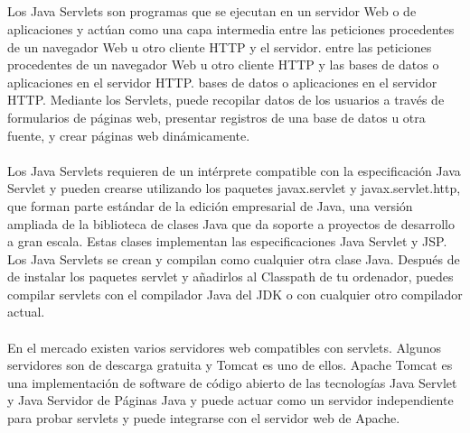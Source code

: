 \documentclass[10pt,a4paper]{article}
\begin{document}
\subsection{\color{colorESCOM}{Servlet}}
\normalsize{
Los Java Servlets son programas que se ejecutan en un servidor Web o de aplicaciones y actúan como una capa intermedia entre las peticiones procedentes de un navegador Web u otro cliente HTTP y el servidor.
entre las peticiones procedentes de un navegador Web u otro cliente HTTP y las bases de datos o aplicaciones en el servidor HTTP.
bases de datos o aplicaciones en el servidor HTTP.
Mediante los Servlets, puede recopilar datos de los usuarios a través de formularios de páginas web, presentar
registros de una base de datos u otra fuente, y crear páginas web dinámicamente.
\\
\\
Los Java Servlets requieren de un intérprete compatible con la especificación Java Servlet y pueden crearse utilizando los paquetes javax.servlet y javax.servlet.http,
que forman parte estándar de la edición empresarial de Java, una versión ampliada de la
biblioteca de clases Java que da soporte a proyectos de desarrollo a gran escala.
Estas clases implementan las especificaciones Java Servlet y JSP.
Los Java Servlets se crean y compilan como cualquier otra clase Java. Después de
de instalar los paquetes servlet y añadirlos al Classpath de tu ordenador, puedes compilar
servlets con el compilador Java del JDK o con cualquier otro compilador actual.
\\
\\
En el mercado existen varios servidores web compatibles con servlets. Algunos servidores
son de descarga gratuita y Tomcat es uno de ellos.
Apache Tomcat es una implementación de software de código abierto de las tecnologías Java Servlet y Java
Servidor de Páginas Java y puede actuar como un servidor independiente para probar servlets y
puede integrarse con el servidor web de Apache.

}
\end{document}
